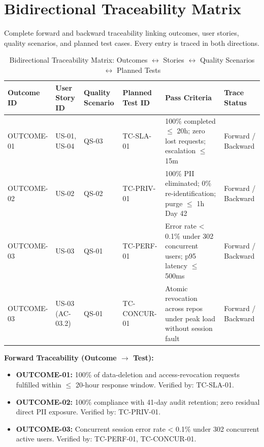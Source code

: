 \documentclass[10pt,a4paper]{article}
\begin{document}
\section{Bidirectional Traceability Matrix}

Complete forward and backward traceability linking outcomes, user stories, quality scenarios, and planned test cases. Every entry is traced in both directions.

\begin{table}[htbp]
\centering
\tiny
\begin{tabularx}{\textwidth}{|l|l|l|l|X|l|}
\hline
\textbf{Outcome ID} & \textbf{User Story ID} & \textbf{Quality Scenario} & \textbf{Planned Test ID} & \textbf{Pass Criteria} & \textbf{Trace Status} \\
\hline
OUTCOME-01 & US-01, US-04 & QS-03 & TC-SLA-01 & 100\% completed $\leq$ 20h; zero lost requests; escalation $\leq$ 15m & Forward / Backward \\
\hline
OUTCOME-02 & US-02 & QS-02 & TC-PRIV-01 & 100\% PII eliminated; 0\% re-identification; purge $\leq$ 1h Day 42 & Forward / Backward \\
\hline
OUTCOME-03 & US-03 & QS-01 & TC-PERF-01 & Error rate < 0.1\% under 302 concurrent users; p95 latency $\leq$ 500ms & Forward / Backward \\
\hline
OUTCOME-03 & US-03 (AC-03.2) & QS-01 & TC-CONCUR-01 & Atomic revocation across repos under peak load without session fault & Forward / Backward \\
\hline
\end{tabularx}
\caption{Bidirectional Traceability Matrix: Outcomes $\leftrightarrow$ Stories $\leftrightarrow$ Quality Scenarios $\leftrightarrow$ Planned Tests}
\label{tab:traceability}
\end{table}

\textbf{Forward Traceability (Outcome $\rightarrow$ Test):}

\begin{itemize}[leftmargin=*]
 \item \textbf{OUTCOME-01:} 100\% of data-deletion and access-revocation requests fulfilled within $\leq$ 20-hour response window. Verified by: TC-SLA-01.
 \item \textbf{OUTCOME-02:} 100\% compliance with 41-day audit retention; zero residual direct PII exposure. Verified by: TC-PRIV-01.
 \item \textbf{OUTCOME-03:} Concurrent session error rate < 0.1\% under 302 concurrent active users. Verified by: TC-PERF-01, TC-CONCUR-01.
\end{itemize}
\end{document}
